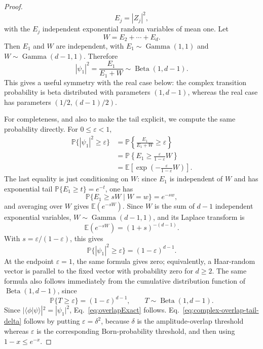 \documentclass[aps,pra,reprint,superscriptaddress,nofootinbib,longbibliography]{revtex4-2}
\newcommand{\eps}{\varepsilon}
\newcommand{\E}{\mathbb{E}}
\newcommand{\PP}{\mathbb{P}}
\begin{document}
\begin{proof}
\begin{equation}
    E_j=|Z_j|^2,
\end{equation}
with the $E_j$ independent exponential random variables of mean one.  Let
\begin{equation}
    W=E_2+\cdots+E_d .
\end{equation}
Then $E_1$ and $W$ are independent, with
$E_1\sim\operatorname{Gamma}(1,1)$ and
$W\sim\operatorname{Gamma}(d-1,1)$. Therefore
\begin{equation}
    |\psi_1|^2
    =
    \frac{E_1}{E_1+W}
    \sim
    \operatorname{Beta}(1,d-1).
    \label{eq:complex-beta-distribution}
\end{equation}
This gives a useful symmetry with the real case below: the complex transition
probability is beta distributed with parameters $(1,d-1)$, whereas the real
case has parameters $(1/2,(d-1)/2)$.

For completeness, and also to make the tail explicit, we compute the same
probability directly. For $0\leq\eps<1$,
\begin{align}
 \PP\{|\psi_1|^2\geq\eps\}
 &=
 \PP\left\{\frac{E_1}{E_1+W}\geq\eps\right\}
 \nonumber\\
 &=
 \PP\left\{E_1\geq \frac{\eps}{1-\eps}W\right\}
 \nonumber\\
 &=
 \E\left[
        \exp\left(-\frac{\eps}{1-\eps}W\right)
      \right].
\end{align}
The last equality is just conditioning on $W$: since $E_1$ is independent of
$W$ and has exponential tail $\PP\{E_1\geq t\}=e^{-t}$, one has
\begin{equation}
    \PP\{E_1\geq sW\mid W=w\}=e^{-sw},
\end{equation}
and averaging over $W$ gives $\E(e^{-sW})$.  Since $W$ is the sum of $d-1$
independent exponential variables, $W\sim\operatorname{Gamma}(d-1,1)$, and
its Laplace transform is
\begin{equation}
    \E(e^{-sW})=(1+s)^{-(d-1)} .
\end{equation}
With $s=\eps/(1-\eps)$, this gives
\begin{equation}
    \PP\{|\psi_1|^2\geq\eps\}
    =
    (1-\eps)^{d-1} .
\end{equation}
At the endpoint $\eps=1$, the same formula gives zero; equivalently, a
Haar-random vector is parallel to the fixed vector with probability zero for
$d\geq2$.  The same formula also follows immediately from the cumulative
distribution function of $\operatorname{Beta}(1,d-1)$, since
\begin{equation}
    \PP\{T\geq\eps\}=(1-\eps)^{d-1},
    \qquad T\sim\operatorname{Beta}(1,d-1).
\end{equation}
Since $|\langle\phi|\psi\rangle|^2=|\psi_1|^2$,
Eq.~\eqref{eq:overlapExact} follows.  Eq.~\eqref{eq:complex-overlap-tail-delta}
follows by putting $\eps=\delta^2$, because $\delta$ is the amplitude-overlap
threshold whereas $\eps$ is the corresponding Born-probability threshold, and
then using $1-x\leq e^{-x}$.
\end{proof}
\end{document}
